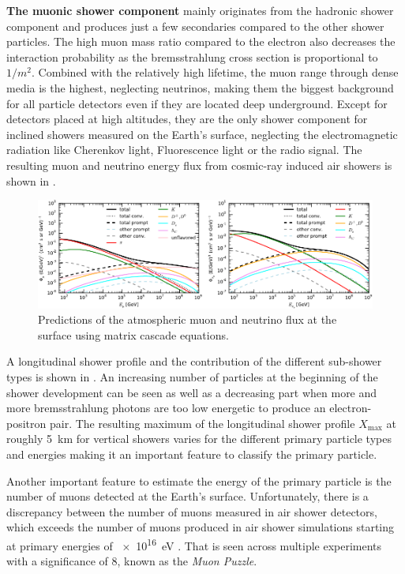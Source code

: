 \textbf{The muonic shower component} mainly originates from the hadronic shower component and produces just a few secondaries compared to the other shower particles.
The high muon mass ratio compared to the electron also decreases the interaction probability as the bremsstrahlung cross section is proportional to $1/m^2$.
Combined with the relatively high lifetime, the muon range through dense media is the highest, neglecting neutrinos, making them the biggest background for all particle detectors even if they are located deep underground.
Except for detectors placed at high altitudes, they are the only shower component for inclined showers measured on the Earth's surface, neglecting the electromagnetic radiation like Cherenkov light, Fluorescence light or the radio signal.
The resulting muon and neutrino energy flux from cosmic-ray induced air showers is shown in .
\begin{figure}
    \centering
    \includegraphics[width=\textwidth]{./images/mceq_mu_nu_flux.pdf}
    \caption{Predictions of the atmospheric muon and neutrino flux at the surface using matrix cascade equations. \cite{Fedynitch15MCEq}}
    \label{fig:atmo_mu_nu_flux}
\end{figure}

A longitudinal shower profile and the contribution of the different sub-shower types is shown in .
An increasing number of particles at the beginning of the shower development can be seen as well as a decreasing part when more and more bremsstrahlung photons are too low energetic to produce an electron-positron pair.
The resulting maximum of the longitudinal shower profile $X_{\mathrm{max}}$ at roughly \SI{5}{km} for vertical showers varies for the different primary particle types and energies making it an important feature to classify the primary particle.

Another important feature to estimate the energy of the primary particle is the number of muons detected at the Earth's surface.
Unfortunately, there is a discrepancy between the number of muons measured in air shower detectors, which exceeds the number of muons produced in air shower simulations starting at primary energies of \SI{e16}{eV} \cite{Dembinski19MuonPuzzle}.
That is seen across multiple experiments with a significance of \SI{8}{\sigma}, known as the \textit{Muon Puzzle}.

